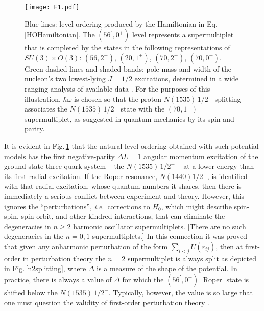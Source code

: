 \begin{figure}[t]
\centerline{\texttt{[image: F1.pdf]}}
\caption{\label{HOlevels}
Blue lines: level ordering produced by the Hamiltonian in Eq.\,\eqref{HOHamiltonian}.  The $(56^\prime,0^+)$ level represents a supermultiplet that is completed by the states in the following representations of $SU(3)\times O(3)$: $(56,2^+)$, $(20,1^+)$, $(70,2^+)$, $(70,0^+)$.
%
Green dashed lines and shaded bands: pole-mass and width of the nucleon's two lowest-lying $J=1/2$ excitations, determined in a wide ranging analysis of available data \cite{Kamano:2013iva}.
%
For the purposes of this illustration, $\hbar \omega$ is chosen so that the proton-$N(1535)\,1/2^-$ splitting associates the $N(1535)\,1/2^-$ state with the $(70,1^-)$ supermultiplet, as suggested in quantum mechanics by its spin and parity.
}
\end{figure}

It is evident in Fig.\,\ref{HOlevels} that the natural level-ordering obtained with such potential models has the first negative-parity $\Delta L=1$ angular momentum excitation of the ground state three-quark system -- the $N(1535)\,1/2^-$ -- at a lower energy than its first radial excitation.  If the Roper resonance, $N(1440)1/2^+$, is identified with that radial excitation, whose quantum numbers it shares, then there is immediately a serious conflict between experiment and theory. However, this ignores the ``perturbations'', \emph{i.e}.\ corrections to $H_0$, which might describe spin-spin, spin-orbit, and other kindred interactions, that can eliminate the degeneracies in $n\geq 2$ harmonic oscillator supermultiplets.  [There are no such degeneracies in the $n=0,1$ supermultiplets.]  In this connection it was proved \cite{Gromes:1976cr, Isgur:1978wd} that given any anharmonic perturbation of the form $\sum_{i<j}U(r_{ij})$, then at first-order in perturbation theory the $n=2$ supermultiplet is always split as depicted in Fig.\,\ref{n2splitting}, where $\Delta$ is a measure of the shape of the potential.  In practice, there is always a value of $\Delta$ for which the $(56^\prime,0^+)$ [Roper] state is shifted below the $N(1535)\,1/2^-$.  Typically, however, the value is so large that one must question the validity of first-order perturbation theory \cite{Isgur:1978wd}.

